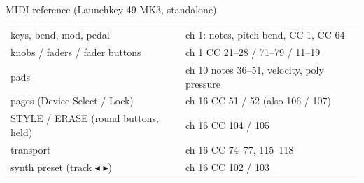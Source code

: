 \documentclass{article}
\begin{document}
\begin{minipage}[t]{128mm}
\begin{card}{MIDI reference (Launchkey 49 MK3, standalone)}
\fontsize{7.2}{8.6}\selectfont
\setlength{\tabcolsep}{3pt}
\begin{tabular}{@{}l l@{}}
keys, bend, mod, pedal & ch 1: notes, pitch bend, CC 1, CC 64 \\
knobs / faders / fader buttons & ch 1 CC 21--28 / 71--79 / 11--19 \\
pads & ch 10 notes 36--51, velocity, poly pressure \\
pages (Device Select / Lock) & ch 16 CC 51 / 52 (also 106 / 107) \\
STYLE / ERASE (round buttons, held) & ch 16 CC 104 / 105 \\
transport & ch 16 CC 74--77, 115--118 \\
synth preset (track \(\blacktriangleleft\) \(\blacktriangleright\)) & ch 16 CC 102 / 103 \\
\end{tabular}
\end{card}
\end{minipage}
\end{document}
